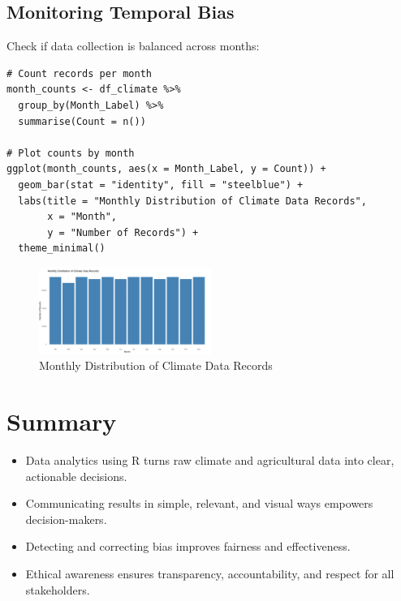 \subsection*{Monitoring Temporal Bias}

Check if data collection is balanced across months:

\begin{verbatim}
# Count records per month
month_counts <- df_climate %>%
  group_by(Month_Label) %>%
  summarise(Count = n())

# Plot counts by month
ggplot(month_counts, aes(x = Month_Label, y = Count)) +
  geom_bar(stat = "identity", fill = "steelblue") +
  labs(title = "Monthly Distribution of Climate Data Records",
       x = "Month",
       y = "Number of Records") +
  theme_minimal()
\end{verbatim}

\begin{figure}[h]
\centering
\includegraphics[width=0.5\textwidth]{figures/month_count.png}
\caption{Monthly Distribution of Climate Data Records}
\end{figure}

\section*{Summary}
\begin{itemize}
    \item Data analytics using R turns raw climate and agricultural data into clear, actionable decisions.
    \item Communicating results in simple, relevant, and visual ways empowers decision-makers.
    \item Detecting and correcting bias improves fairness and effectiveness.
    \item Ethical awareness ensures transparency, accountability, and respect for all stakeholders.
\end{itemize}
